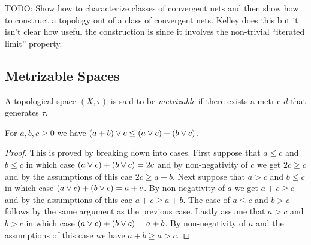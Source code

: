  TODO: Show how to characterize classes of convergent nets and then show how to construct a topology out of a class of convergent nets.  Kelley does this but it isn't clear how useful the construction is since it involves the non-trivial ``iterated limit'' property.

\subsection{Metrizable Spaces}

\begin{defn}A topological space $(X,\tau)$ is said to be \emph{metrizable} if there exists a metric $d$ that generates $\tau$.
\end{defn}

\begin{lem}\label{MaxPlusInequality}For $a,b,c \geq 0$ we have $(a+b) \vee c \leq (a \vee c) + (b \vee c)$.
\end{lem}
\begin{proof}
This is proved by breaking down into cases.
First suppose that $a \leq c$ and $b \leq c$ in which case $(a \vee c) + (b \vee c) = 2c$ and by non-negativity of $c$ we get $2c \geq c$ and by the assumptions of this cae $2c \geq a+b$.  
Next suppose that $a > c$ and $b \leq c$ in which case $(a \vee c) + (b \vee c) = a+c$.  By non-negativity of $a$ we get $a+c \geq c$ and by the assumptions of this cae $a+c \geq a+b$.
The case of $a \leq c$ and $b > c$ follows by the same argument as the previous case.  Lastly assume that $a > c$ and $b > c$ in which case $(a \vee c) + (b \vee c) = a+b$.  By non-negativity of $a$ and the assumptions of this case we have $a+b \geq a > c$.
\end{proof}

